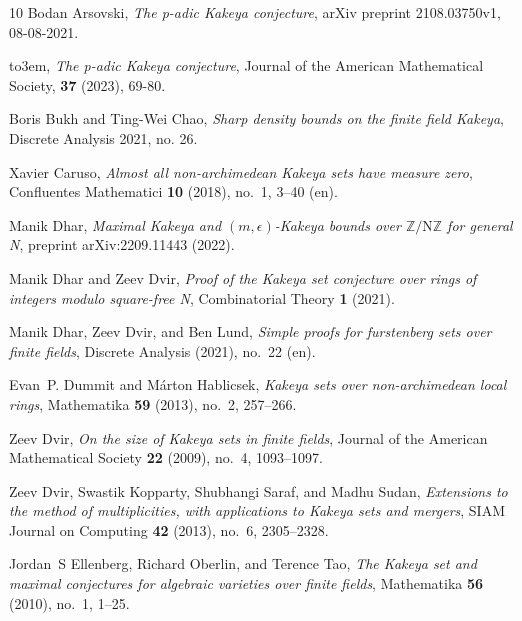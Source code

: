 \begin{thebibliography}{10}
\providecommand{\bysame}{\leavevmode\hbox to3em{\hrulefill}\thinspace}
\providecommand{\MR}{\relax\ifhmode\unskip\space\fi MR }
\providecommand{\MRhref}[2]{%
  \href{http://www.ams.org/mathscinet-getitem?mr=#1}{#2}
}
\providecommand{\href}[2]{#2}
Bodan Arsovski, \emph{The p-adic {K}akeya conjecture}, arXiv preprint
  2108.03750v1, 08-08-2021.

\bysame, \emph{The p-adic {K}akeya conjecture}, Journal of the American Mathematical Society, \textbf{37} (2023), 69-80.



Boris Bukh and Ting-Wei Chao, \emph{Sharp density bounds on the finite field
  {K}akeya}, Discrete Analysis 2021, no. 26.

Xavier Caruso, \emph{Almost all non-archimedean {K}akeya sets have measure
  zero}, Confluentes Mathematici \textbf{10} (2018), no.~1, 3--40 (en).

Manik Dhar, \emph{{Maximal Kakeya and $(m,\epsilon)$-Kakeya bounds over
  $\mathbb{Z}/\text{{N}}\mathbb{Z}$ for general N}}, preprint arXiv:2209.11443
  (2022).

Manik Dhar and Zeev Dvir, \emph{Proof of the {K}akeya set conjecture over rings
  of integers modulo square-free {N}}, Combinatorial Theory \textbf{1} (2021).

Manik Dhar, Zeev Dvir, and Ben Lund, \emph{Simple proofs for furstenberg sets
  over finite fields}, Discrete Analysis (2021), no.~22 (en).

Evan~P. Dummit and Márton Hablicsek, \emph{Kakeya sets over non-archimedean
  local rings}, Mathematika \textbf{59} (2013), no.~2, 257–266.

Zeev Dvir, \emph{On the size of {K}akeya sets in finite fields}, Journal of the
  American Mathematical Society \textbf{22} (2009), no.~4, 1093--1097.

Zeev Dvir, Swastik Kopparty, Shubhangi Saraf, and Madhu Sudan, \emph{Extensions
  to the method of multiplicities, with applications to {K}akeya sets and
  mergers}, SIAM Journal on Computing \textbf{42} (2013), no.~6, 2305--2328.

Jordan~S Ellenberg, Richard Oberlin, and Terence Tao, \emph{The {K}akeya set
  and maximal conjectures for algebraic varieties over finite fields},
  Mathematika \textbf{56} (2010), no.~1, 1--25.


\end{thebibliography}
